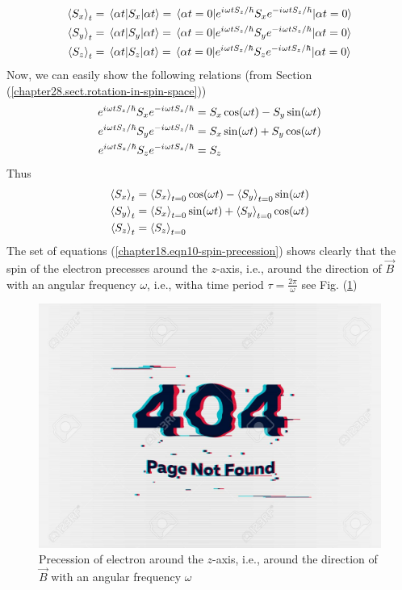 \begin{align*}
\expval{S_x}_t &= \mel{\alpha t}{S_x}{\alpha t} = \mel{\alpha t=0}{e^{{i\mkern1mu}\omega t S_z / \hbar} S_x e^{-{i\mkern1mu}\omega t S_z / \hbar}}{\alpha t=0} \\
\expval{S_y}_t &= \mel{\alpha t}{S_y}{\alpha t} = \mel{\alpha t=0}{e^{{i\mkern1mu}\omega t S_z / \hbar} S_y e^{-{i\mkern1mu}\omega t S_z / \hbar}}{\alpha t=0} \\
\expval{S_z}_t &= \mel{\alpha t}{S_z}{\alpha t} = \mel{\alpha t=0}{e^{{i\mkern1mu}\omega t S_z / \hbar} S_z e^{-{i\mkern1mu}\omega t S_z / \hbar}}{\alpha t=0}
\end{align*}
Now, we can easily show the following relations (from Section (\ref{chapter28.sect.rotation-in-spin-space}))
\begin{align*}
e^{{i\mkern1mu}\omega t S_z / \hbar} S_x e^{-{i\mkern1mu}\omega t S_z / \hbar} &= S_x\cos(\omega t) - S_y\sin(\omega t)\\
e^{{i\mkern1mu}\omega t S_z / \hbar} S_y e^{-{i\mkern1mu}\omega t S_z / \hbar} &= S_x\sin(\omega t) + S_y\cos(\omega t) \\
e^{{i\mkern1mu}\omega t S_z / \hbar} S_z e^{-{i\mkern1mu}\omega t S_z / \hbar} &= S_z
\end{align*}
Thus
\begin{align}
\label{chapter18.eqn10-spin-precession}
\begin{split}
\expval{S_x}_t &= \expval{S_x}_{t=0}\cos(\omega t) - \expval{S_y}_{t=0}\sin(\omega t) \\
\expval{S_y}_t &= \expval{S_x}_{t=0}\sin(\omega t) + \expval{S_y}_{t=0}\cos(\omega t) \\
\expval{S_z}_t &= \expval{S_z}_{t=0}
\end{split}
\end{align}
The set of equations (\ref{chapter18.eqn10-spin-precession}) shows clearly that the spin of the electron precesses around the $z$-axis, i.e., around the direction of $\vec{B}$ with an angular frequency $\omega$, i.e., witha time period $\tau = \frac{2\pi}{\omega}$ see Fig. (\ref{chapter18.fig6})
\begin{figure}
	\centering
	\includegraphics[width=0.5\linewidth]{Pictures/not-found.jpg}
	\caption{Precession of electron  around the $z$-axis, i.e., around the direction of $\vec{B}$ with an angular frequency $\omega$}
	\label{chapter18.fig6}
\end{figure}